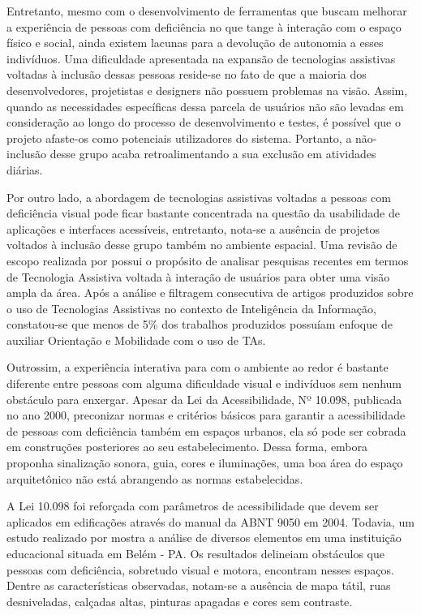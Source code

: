 Entretanto, mesmo com o desenvolvimento de ferramentas que buscam melhorar a experiência de pessoas com deficiência no que tange à interação com o espaço físico e social, ainda existem lacunas para a devolução de autonomia a esses indivíduos. Uma dificuldade apresentada na expansão de tecnologias assistivas voltadas à inclusão dessas pessoas reside-se no fato de que a maioria dos desenvolvedores, projetistas e designers não possuem problemas na visão. Assim, quando as necessidades específicas dessa parcela de usuários não são levadas em consideração ao longo do processo de desenvolvimento e testes, é possível que o projeto afaste-os como potenciais utilizadores do sistema. Portanto, a não-inclusão desse grupo acaba retroalimentando a sua exclusão em atividades diárias. 

Por outro lado, a abordagem de tecnologias assistivas voltadas a pessoas com deficiência visual pode ficar bastante concentrada na questão da usabilidade de aplicações e interfaces acessíveis, entretanto, nota-se a ausência de projetos voltados à inclusão desse grupo também no ambiente espacial. Uma revisão de escopo realizada por \cite{TecnologiaAssistivaDeficienciaVisual} possui o propósito de analisar pesquisas recentes em termos de Tecnologia Assistiva voltada à interação de usuários para obter uma visão ampla da área. Após a análise e filtragem consecutiva de artigos produzidos sobre o uso de Tecnologias Assistivas no contexto de Inteligência da Informação, constatou-se que menos de 5\% dos trabalhos produzidos possuíam enfoque de auxiliar Orientação e Mobilidade com o uso de TAs.

Outrossim, a experiência interativa para com o ambiente ao redor é bastante diferente entre pessoas com alguma dificuldade visual e indivíduos sem nenhum obstáculo para enxergar. Apesar da Lei da Acessibilidade, Nº 10.098, publicada no ano 2000, preconizar normas e critérios básicos para garantir a acessibilidade de pessoas com deficiência também em espaços urbanos, ela só pode ser cobrada em construções posteriores ao seu estabelecimento. Dessa forma, embora proponha sinalização sonora, guia, cores e iluminações, uma boa área do espaço arquitetônico não está abrangendo as normas estabelecidas.

A Lei 10.098 foi reforçada com parâmetros de acessibilidade que devem ser aplicados em edificações através do manual da ABNT 9050 em 2004. Todavia, um estudo realizado por \cite{BarreirasArquitetonicas} mostra a análise de diversos elementos em uma instituição educacional situada em Belém - PA. Os resultados delineiam obstáculos que pessoas com deficiência, sobretudo visual e motora, encontram nesses espaços. Dentre as características observadas, notam-se a ausência de mapa tátil, ruas desniveladas, calçadas altas, pinturas apagadas e cores sem contraste.  


